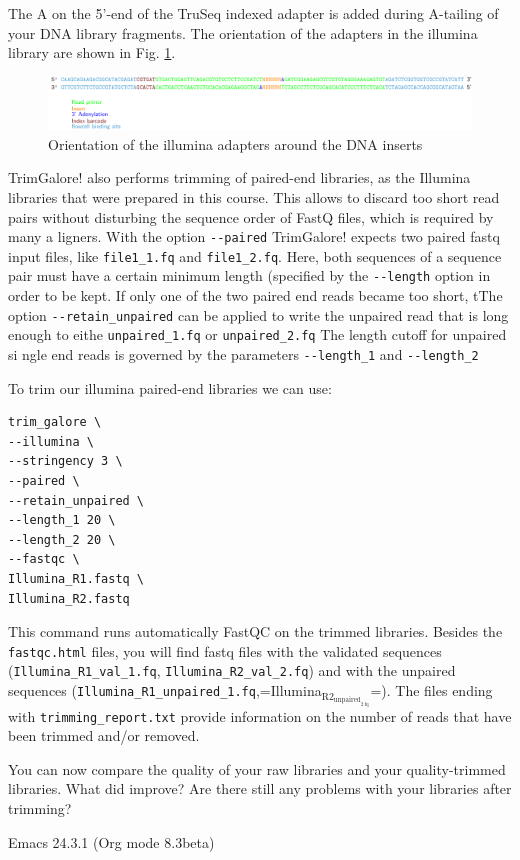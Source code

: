 \documentclass[11pt]{article}
\begin{document}
The A on the 5'-end of the TruSeq indexed adapter is added during
A-tailing of your DNA library fragments.
The orientation of the adapters in the illumina library are shown in Fig. \ref{fig:illuminaadapters}.
\begin{figure}[htb]
\centering
\includegraphics[width=17cm]{IlluminaAdaptersVisualized.pdf}
\caption{\label{fig:illuminaadapters}Orientation of the illumina adapters around the DNA inserts}
\end{figure}


TrimGalore! also performs trimming of paired-end libraries, as the
Illumina libraries that were prepared in this course. This allows to
discard too short read pairs without disturbing the sequence order of
FastQ files, which is required by many a ligners.  With the option
\texttt{-{}-paired} TrimGalore! expects two paired fastq input files, like
\texttt{file1\_1.fq} and \texttt{file1\_2.fq}.  Here, both sequences of a sequence
pair must have a certain minimum length (specified by the \texttt{-{}-length}
option in order to be kept. If only one of the two paired end reads
became too short, tThe option \texttt{-{}-retain\_unpaired} can be applied to
write the unpaired read that is long enough to eithe \texttt{unpaired\_1.fq}
or \texttt{unpaired\_2.fq} The length cutoff for unpaired si ngle end reads is
governed by the parameters \texttt{-{}-length\_1} and \texttt{-{}-length\_2}

To trim our illumina paired-end libraries we can use:

\begin{verbatim}
trim_galore \
--illumina \
--stringency 3 \
--paired \
--retain_unpaired \
--length_1 20 \
--length_2 20 \
--fastqc \
Illumina_R1.fastq \
Illumina_R2.fastq
\end{verbatim}

This command runs automatically FastQC on the trimmed
libraries. Besides the \texttt{fastqc.html} files, you will find fastq files
with the validated sequences (\texttt{Illumina\_R1\_val\_1.fq},
\texttt{Illumina\_R2\_val\_2.fq}) and with the unpaired sequences
(\texttt{Illumina\_R1\_unpaired\_1.fq},=Illumina\(_{\text{R2}}_{\text{unpaired}}_{\text{2.fq}}\)=).  The files
ending with \texttt{trimming\_report.txt} provide information on the number of
reads that have been trimmed and/or removed.

You can now compare the quality of your raw libraries and your
quality-trimmed libraries. What did improve? Are there still any
problems with your libraries after trimming?


\clearpage
Emacs 24.3.1 (Org mode 8.3beta)
\end{document}
